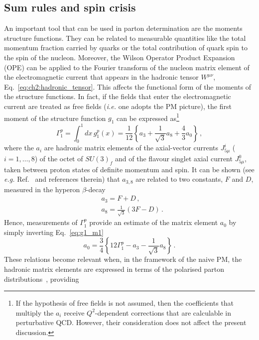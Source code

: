 \subsection*{Sum rules and spin crisis}
An important tool that can be used in parton determination are the moments structure functions. They can be related to measurable quantities like the total momentum fraction carried by quarks or the total contribution of quark spin to the spin of the nucleon. Moreover, the Wilson Operator Product Expansion (OPE) can be applied to the Fourier transform of the nucleon matrix element of the electromagnetic current that appears in the hadronic tensor $W^{\mu \nu}$, Eq.~\eqref{eq:ch2:hadronic_tensor}. This affects the functional form of the moments of the structure functions. In fact, if the fields that enter the electromagnetic current are treated as free fields (\textit{i.e.} one adopts the PM picture), the first moment of the structure function $g_1$ can be expressed as\footnote{\footnotesize If the hypothesis of free fields is not assumed, then the coefficients that multiply the $a_i$ receive $Q^2$-dependent corrections that are calculable in perturbative QCD. However, their consideration does not affect the present discussion.}
\begin{equation}
  \Gamma_{1}^{p} = \int_{0}^{1} dx \, g_{1}^{p}(x) = \frac{1}{12} \left\{ a_3 + \frac{1}{\sqrt{3}} a_8 + \frac{4}{3} a_{0} \right\}\,,
  \label{eq:g1_m1}
\end{equation}
where the $a_i$ are hadronic matrix elements of the axial-vector currents $J^{i}_{5 \mu}$ ($i=1,\dots,8$) of the octet of $SU(3)_{f}$ and of the flavour singlet axial current $J^{0}_{5 \mu}$, taken between proton states of definite momentum and spin. It can be shown (see \textit{e.g.} Ref.~\cite{Anselmino:1994gn} and references therein) that $a_{3,8}$ are related to two constants, $F$ and $D$, measured in the hyperon $\beta$-decay
\begin{align}
  & a_3 = F + D \,, \\
  & a_8 = \frac{1}{\sqrt{3}} (3F - D)\,.
\end{align}
Hence, measurements of $\Gamma_{1}^{p}$ provide an estimate of the matrix element $a_0$ by simply inverting Eq.~\eqref{eq:g1_m1}
\begin{equation}
  a_0 =  \frac{3}{4} \left\{ 12 \Gamma_{1}^p - a_3 - \frac{1}{\sqrt{3}} a_8 \right\}\,.
\end{equation}
These relations become relevant when, in the framework of the naive PM, the hadronic matrix elements are expressed in terms of the polarised parton distributions~\cite{Anselmino:1994gn}, providing
